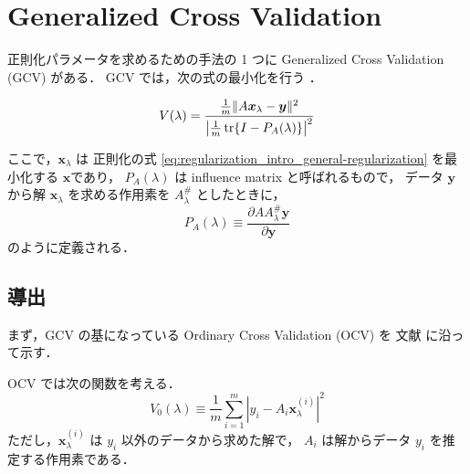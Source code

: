 %

\chapter{Generalized Cross Validation}

正則化パラメータを求めるための手法の 1 つに
Generalized Cross Validation (GCV) がある．
GCV では，次の式の最小化を行う
\cite{Wahba1990}．

\begin{equation}
    V(\lambda)
    = \frac{\frac{1}{m} \|A \bm{x}_\lambda - \bm{y}\|^2}
    {\left|\frac{1}{m} \operatorname{tr}\{I - P_A(\lambda)\}\right|^2}
    \label{eq:regularization_gcv_gcv-evaluation-function}
\end{equation}

ここで，$\bm{x}_\lambda$ は
正則化の式 \eqref{eq:regularization_intro_general-regularization} を最小化する
$\bm{x}$であり，
$P_A(\lambda)$ は influence matrix と呼ばれるもので，
データ $\bm{y}$ から解 $\bm{x}_\lambda$ を求める作用素を $A_\lambda^\#$ としたときに，
\begin{equation}
    P_A(\lambda) \equiv
    \frac{\partial A A_\lambda^\# \bm{y}}{\partial \bm{y}}
    \label{eq:regularization_gcv_influence-matrix}
\end{equation}
のように定義される．

\section{導出}

まず，GCV の基になっている Ordinary Cross Validation (OCV) を
文献 \cite{Wahba1990} に沿って示す．

OCV では次の関数を考える．
\begin{equation}
    V_0(\lambda) \equiv
    \frac{1}{m} \sum_{i=1}^m
    \left|y_i - A_i \bm{x}_\lambda^{(i)}\right|^2
    \label{eq:regularization_gcv_ocv-evaluation-function}
\end{equation}
ただし，$\bm{x}_\lambda^{(i)}$ は $y_i$ 以外のデータから求めた解で，
$A_i$ は解からデータ $y_i$ を推定する作用素である．

